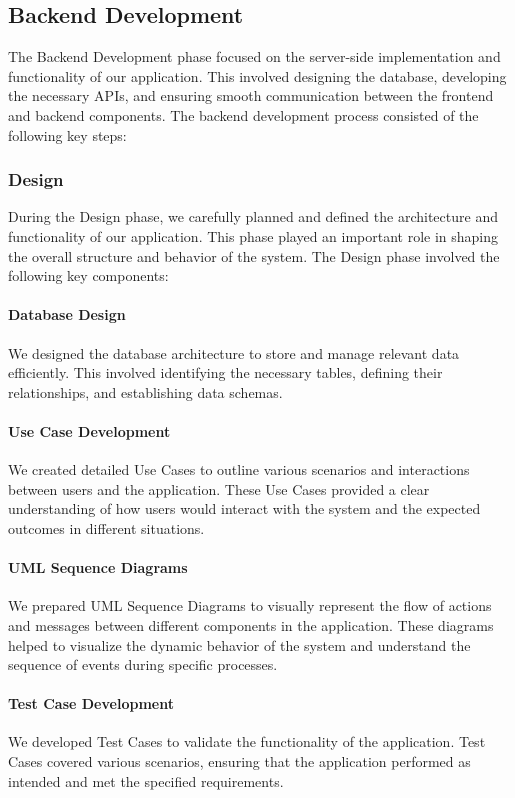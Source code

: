 \documentclass[conference]{IEEEtran}
\begin{document}
\subsection{Backend Development}
The Backend Development phase focused on the server-side implementation and functionality of our application. This involved designing the database, developing the necessary APIs, and ensuring smooth communication between the frontend and backend components. The backend development process consisted of the following key steps:
    \subsubsection{Design}
    During the Design phase, we carefully planned and defined the architecture and functionality of our application. This phase played an important role in shaping the overall structure and behavior of the system. The Design phase involved the following key components:
        \paragraph{Database Design}
        We designed the database architecture to store and manage relevant data efficiently.
	This involved identifying the  necessary tables, defining their relationships, and establishing data schemas.
    \paragraph{Use Case Development}
    We created detailed Use Cases to outline various scenarios and interactions between users and the application.
	These Use Cases provided a clear understanding of how users would interact with the system and the expected outcomes in different situations.
    \paragraph{UML Sequence Diagrams}
    We prepared UML Sequence Diagrams to visually represent the flow of actions and messages between different components in the application.
	These diagrams helped to visualize the dynamic behavior of the system and understand the sequence of events during specific processes.
 \paragraph{Test Case Development}
 We developed  Test Cases to validate the functionality of the application.
	Test Cases covered various scenarios, ensuring that the application performed as intended and met the specified requirements.
\end{document}
